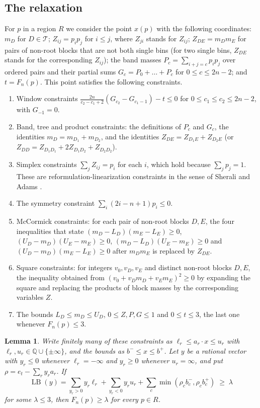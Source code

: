 \documentclass[11pt]{amsart}
\newtheorem{lemma}[theorem]{Lemma}
\theoremstyle{definition}
\theoremstyle{remark}
\numberwithin{equation}{section}
\newcommand{\Q}{\mathbb{Q}}
\newcommand{\LB}{\operatorname{LB}}
\begin{document}
\subsection{The relaxation} For $p$ in a region $R$ we consider the point $x(p)$ with the following coordinates: $m_D$ for $D\in\mathcal{T}$; $Z_{ij}=p_ip_j$ for $i\le j$, where $Z_{ji}$ stands for $Z_{ij}$; $Z_{DE}=m_Dm_E$ for pairs of non-root blocks that are not both single bins (for two single bins, $Z_{DE}$ stands for the corresponding $Z_{ij}$); the band masses $P_c=\sum_{i+j=c}p_ip_j$ over ordered pairs and their partial sums $G_c=P_0+\dots+P_c$ for $0\le c\le 2n-2$; and $t=F_n(p)$. This point satisfies the following constraints.
\begin{enumerate}[label=(\roman*)]
\item\label{c:win} Window constraints $\frac{2n}{c_2-c_1+2}(G_{c_2}-G_{c_1-1})-t\le0$ for $0\le c_1\le c_2\le 2n-2$, with $G_{-1}=0$.
\item Band, tree and product constraints: the definitions of $P_c$ and $G_c$, the identities $m_D=m_{D_1}+m_{D_2}$, and the identities $Z_{DE}=Z_{D_1E}+Z_{D_2E}$ (or $Z_{DD}=Z_{D_1D_1}+2Z_{D_1D_2}+Z_{D_2D_2}$).
\item Simplex constraints $\sum_jZ_{ij}=p_i$ for each $i$, which hold because $\sum_jp_j=1$. These are reformulation-linearization constraints in the sense of Sherali and Adams \cite{SA90}.
\item The symmetry constraint $\sum_i(2i-n+1)p_i\le0$.
\item\label{c:mc} McCormick constraints: for each pair of non-root blocks $D,E$, the four inequalities that state $(m_D-L_D)(m_E-L_E)\ge0$, $(U_D-m_D)(U_E-m_E)\ge0$, $(m_D-L_D)(U_E-m_E)\ge0$ and $(U_D-m_D)(m_E-L_E)\ge0$ after $m_Dm_E$ is replaced by $Z_{DE}$.
\item\label{c:sq} Square constraints: for integers $v_0,v_D,v_E$ and distinct non-root blocks $D,E$, the inequality obtained from $(v_0+v_Dm_D+v_Em_E)^2\ge0$ by expanding the square and replacing the products of block masses by the corresponding variables $Z$.
\item The bounds $L_D\le m_D\le U_D$, $0\le Z,P,G\le1$ and $0\le t\le3$, the last one whenever $F_n(p)\le 3$.
\end{enumerate}

\begin{lemma}\label{lem:duality}
Write finitely many of these constraints as $\ell_r\le a_r\cdot x\le u_r$ with $\ell_r,u_r\in\Q\cup\{\pm\infty\}$, and the bounds as $b^-\le x\le b^+$. Let $y$ be a rational vector with $y_r\le0$ whenever $\ell_r=-\infty$ and $y_r\ge0$ whenever $u_r=\infty$, and put $\rho=e_t-\sum_ry_ra_r$. If
\[
\LB(y)=\sum_{y_r>0}y_r\ell_r+\sum_{y_r<0}y_ru_r+\sum_c\min(\rho_cb^-_c,\rho_cb^+_c)\;\ge\;\lambda
\]
for some $\lambda\le3$, then $F_n(p)\ge\lambda$ for every $p\in R$.
\end{lemma}
\end{document}
